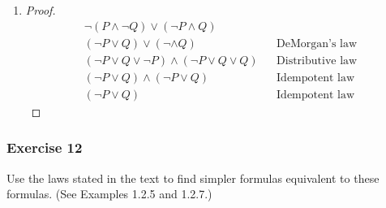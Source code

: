 \begin{solution}
\begin{enumerate}[label=(\alph*)]
            \item {
                \begin{proof}
                    \begin{align*}
                        \neg(P \wedge \neg Q) \vee (\neg P \wedge Q) \\
                        (\neg P \vee Q) \vee (\neg \wedge Q) && \text{DeMorgan's law} \\
                        (\neg P \vee Q \vee \neg P) \wedge (\neg P \vee Q \vee Q) && \text{Distributive law} \\
                        (\neg P \vee Q) \wedge (\neg P \vee Q) && \text{Idempotent law} \\
                        (\neg P \vee Q) && \text{Idempotent law}
                    \end{align*}
                \end{proof}
            }
        \end{enumerate}
    \end{solution}



\subsubsection{Exercise 12}

\question Use the laws stated in the text to find simpler formulas equivalent to these formulas. (See Examples 1.2.5 and 1.2.7.)

    
